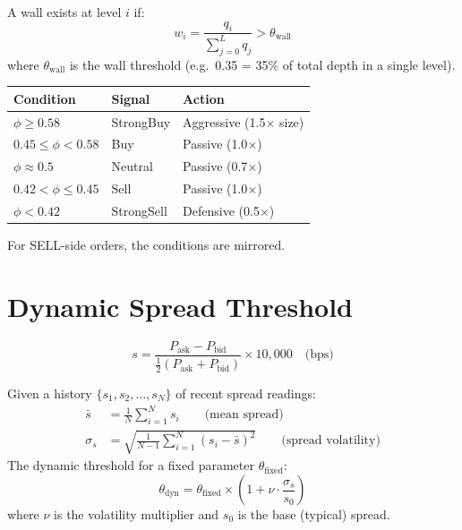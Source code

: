 \documentclass[11pt,a4paper]{article}
\begin{document}
\begin{formulabox}[title={\S6.3 — Wall Detection}]
A wall exists at level $i$ if:
\begin{equation}
  w_i = \frac{q_i}{\displaystyle\sum_{j=0}^{L} q_j} > \theta_{\text{wall}}
\end{equation}
where $\theta_{\text{wall}}$ is the wall threshold (e.g.\ 0.35 = 35\% of total depth in a single level).
\end{formulabox}

\begin{formulabox}[title={\S6.4 — Signal Classification}]
\begin{center}
\begin{tabular}{lll}
\toprule
\textbf{Condition} & \textbf{Signal} & \textbf{Action} \\
\midrule
$\phi \geq 0.58$ & StrongBuy  & Aggressive (1.5$\times$ size) \\
$0.45 \leq \phi < 0.58$ & Buy     & Passive (1.0$\times$) \\
$\phi \approx 0.5$       & Neutral & Passive (0.7$\times$) \\
$0.42 < \phi \leq 0.45$ & Sell     & Passive (1.0$\times$) \\
$\phi < 0.42$            & StrongSell & Defensive (0.5$\times$) \\
\bottomrule
\end{tabular}
\end{center}
For SELL-side orders, the conditions are mirrored.
\end{formulabox}


\section{Dynamic Spread Threshold}

\begin{formulabox}[title={\S7.1 — Spread Measurement}]
\begin{equation}
  s = \frac{P_{\text{ask}} - P_{\text{bid}}}{\frac{1}{2}(P_{\text{ask}} + P_{\text{bid}})} \times 10{,}000 \quad \text{(bps)}
\end{equation}
\end{formulabox}

\begin{formulabox}[title={\S7.2 — Volatility-Aware Dynamic Threshold}]
Given a history $\{s_1, s_2, \ldots, s_N\}$ of recent spread readings:
\begin{align}
  \bar{s} &= \frac{1}{N}\sum_{i=1}^{N} s_i \qquad \text{(mean spread)} \\
  \sigma_s &= \sqrt{\frac{1}{N-1}\sum_{i=1}^{N}(s_i - \bar{s})^2} \qquad \text{(spread volatility)}
\end{align}
The dynamic threshold for a fixed parameter $\theta_{\text{fixed}}$:
\begin{equation}
  \theta_{\text{dyn}} = \theta_{\text{fixed}} \times \left(1 + \nu \cdot \frac{\sigma_s}{s_0}\right)
\end{equation}
where $\nu$ is the volatility multiplier and $s_0$ is the base (typical) spread.
\end{formulabox}
\end{document}
